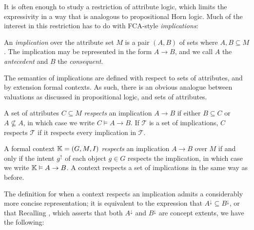 It is often enough to study a restriction of attribute logic, which limits the expressivity in a way that is analogous
to propositional Horn logic. Much of the interest in this restriction has to do with FCA-style \textit{implications}:

\begin{definition}
	\label{definition:implication}

	An \emph{implication} over the attribute set $M$ is a pair $(A,B)$ of sets where $A,B \subseteq M$. The implication
	may be represented in the form $A \rightarrow B$, and we call $A$ the \emph{antecedent} and $B$ the \emph{consequent}.
\end{definition}

The semantics of implications are defined with respect to sets of attributes, and by extension formal contexts. As such,
there is an obvious analogue between valuations as discussed in propositional logic, and sets of attributes.

\begin{definition}
	\label{definition:implication-respect}

	A set of attributes $C \subseteq M$ \emph{respects} an implication $A\rightarrow B$ if either $B \subseteq C$ or $A \not
	\subseteq A$, in which case we write $C \vDash A \rightarrow B$. If $\mathcal{T}$ is a set of implications, $C$
	respects $\mathcal{T}$ if it respects every implication in $\mathcal{T}$.
\end{definition}

\begin{definition}
	\label{definition:implication-respect-context}

	A formal context $\mathbb{K} = (G,M,\mathrel{I})$ \emph{respects} an implication $A \rightarrow B$ over $M$ if and only if the intent
	$g^{\uparrow}$ of each object $g \in G$ respects the implication, in which case we write
	$\mathbb{K} \vDash A \rightarrow B$. A context respects a set of implications in the same way as before.
\end{definition}

The definition for when a context respects an implication admits a considerably more concise representation; it is
equivalent to the expression that $A^{\downarrow}\subseteq B^{\downarrow}$, or that 
Recalling , which asserts that both $A^{\downarrow}$ and $B^{\downarrow}$ are
concept extents, we have the following:

